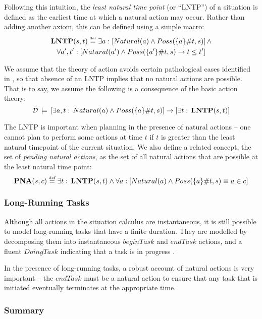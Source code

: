 Following this intuition, the \emph{least natural time point} (or
{}``LNTP'') of a situation is defined as the earliest time at which
a natural action may occur. Rather than adding another axiom, this
can be defined using a simple macro: \begin{multline*}
\mathbf{LNTP}(s,t)\stackrel{\mbox{\tiny def}}{=}\exists a:\left[Natural(a)\wedge Poss(\{a\}\#t,s)\right]\wedge\\
\forall a',t':\left[Natural(a')\wedge Poss(\{a'\}\#t,s)\rightarrow t\leq t'\right]\end{multline*}


We assume that the theory of action avoids certain pathological cases
identified in \citep{reiter01kia}, so that absence of an LNTP implies
that no natural actions are possible. That is to say, we assume the
following is a consequence of the basic action theory:\[
\mathcal{D}\,\models\,\left[\exists a,t:\, Natural(a)\wedge Poss(\{a\}\#t,s)\right]\rightarrow\left[\exists t:\,\mathbf{LNTP}(s,t)\right]\]


The LNTP is important when planning in the presence of natural actions
-- one cannot plan to perform some actions at time $t$ if $t$ is
greater than the least natural timepoint of the current situation.
We also define a related concept, the set of \emph{pending natural
actions}, as the set of all natural actions that are possible at the
least natural time point:\[
\mathbf{PNA}(s,c)\stackrel{\mbox{\tiny def}}{=}\exists t:\,\mathbf{LNTP}(s,t)\wedge\forall a:\left[Natural(a)\wedge Poss(\{a\}\#t,s)\equiv a\in c\right]\]



\subsubsection{Long-Running Tasks}

Although all actions in the situation calculus are instantaneous,
it is still possible to model long-running tasks that have a finite
duration. They are modelled by decomposing them into instantaneous
$beginTask$ and $endTask$ actions, and a fluent $DoingTask$ indicating
that a task is in progress \citep{pinto94temporal}.

In the presence of long-running tasks, a robust account of natural
actions is very important -- the $endTask$ must be a natural action
to ensure that any task that is initiated eventually terminates at
the appropriate time.


\subsubsection{Summary}

